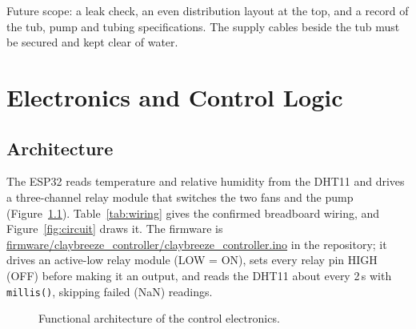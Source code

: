 \documentclass[11pt,a4paper]{report}
\begin{document}
\noindent Future scope: a leak check, an even distribution layout at the top, and a record of the tub, pump and tubing specifications. The supply cables beside the tub must be secured and kept clear of water.

\chapter{Electronics and Control Logic}
\label{ch:electronics}

\section{Architecture}
The ESP32 reads temperature and relative humidity from the DHT11 and drives a three-channel relay module that switches the two fans and the pump (Figure~\ref{fig:arch}). Table~\ref{tab:wiring} gives the confirmed breadboard wiring, and Figure~\ref{fig:circuit} draws it. The firmware is \url{firmware/claybreeze_controller/claybreeze_controller.ino} in the repository; it drives an active-low relay module (LOW = ON), sets every relay pin HIGH (OFF) before making it an output, and reads the DHT11 about every 2\,s with \texttt{millis()}, skipping failed (NaN) readings.

\begin{figure}[H]
\centering
{}
\caption{Functional architecture of the control electronics.}
\label{fig:arch}
\end{figure}
\end{document}
